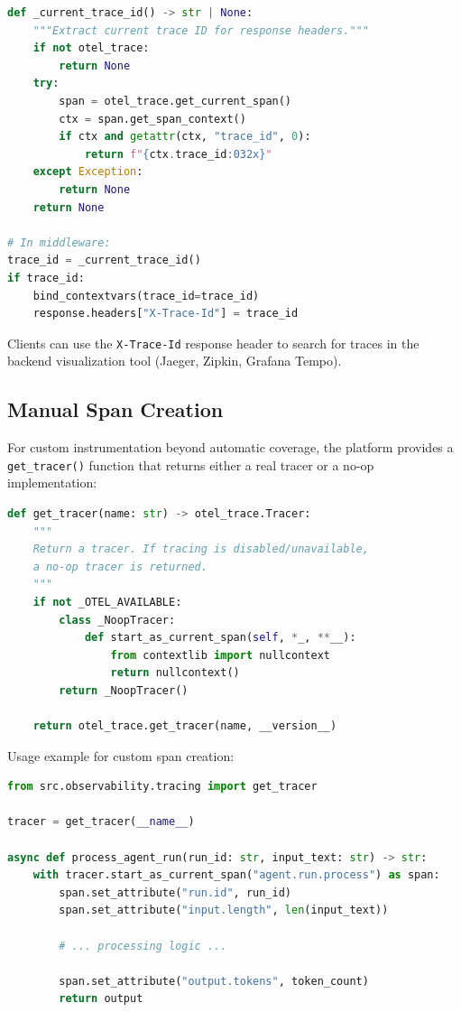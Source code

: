 \begin{lstlisting}[language=Python, caption={Trace ID extraction and response headers}]
def _current_trace_id() -> str | None:
    """Extract current trace ID for response headers."""
    if not otel_trace:
        return None
    try:
        span = otel_trace.get_current_span()
        ctx = span.get_span_context()
        if ctx and getattr(ctx, "trace_id", 0):
            return f"{ctx.trace_id:032x}"
    except Exception:
        return None
    return None

# In middleware:
trace_id = _current_trace_id()
if trace_id:
    bind_contextvars(trace_id=trace_id)
    response.headers["X-Trace-Id"] = trace_id
\end{lstlisting}

Clients can use the \texttt{X-Trace-Id} response header to search for traces in the backend visualization tool (Jaeger, Zipkin, Grafana Tempo).

\subsection{Manual Span Creation}

For custom instrumentation beyond automatic coverage, the platform provides a \texttt{get\_tracer()} function that returns either a real tracer or a no-op implementation:

\begin{lstlisting}[language=Python, caption={Manual tracer access with no-op fallback}]
def get_tracer(name: str) -> otel_trace.Tracer:
    """
    Return a tracer. If tracing is disabled/unavailable, 
    a no-op tracer is returned.
    """
    if not _OTEL_AVAILABLE:
        class _NoopTracer:
            def start_as_current_span(self, *_, **__):
                from contextlib import nullcontext
                return nullcontext()
        return _NoopTracer()
    
    return otel_trace.get_tracer(name, __version__)
\end{lstlisting}

Usage example for custom span creation:

\begin{lstlisting}[language=Python, caption={Example of manual span instrumentation}]
from src.observability.tracing import get_tracer

tracer = get_tracer(__name__)

async def process_agent_run(run_id: str, input_text: str) -> str:
    with tracer.start_as_current_span("agent.run.process") as span:
        span.set_attribute("run.id", run_id)
        span.set_attribute("input.length", len(input_text))
        
        # ... processing logic ...
        
        span.set_attribute("output.tokens", token_count)
        return output
\end{lstlisting}

